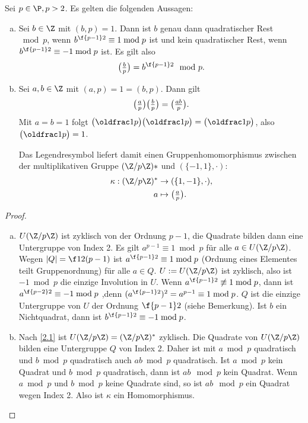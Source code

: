 \begin{lem} \label{2.14}
	Sei $p \in \P, p > 2$.
	Es gelten die folgenden Aussagen:
	\begin{enumerate}[a)]
		\item
			Sei $b \in \Z$ mit $(b, p) = 1$.
			Dann ist $b$ genau dann quadratischer Rest $\bmod p$, wenn $b^{\f {p-1}2} \equiv 1 \bmod p$
			ist und kein quadratischer Rest, wenn $b^{\f {p-1}2} \equiv -1 \bmod p$	ist.
			Es gilt also
			\[
				\legsym bp = b^{\f {p-1}2} \mod p.
			\]
		\item
			Sei $a, b \in \Z$ mit $(a,p) = 1 = (b, p)$.
			Dann gilt
			\[
				\legsym ap \legsym bp = \legsym {ab}p.
			\]
			Mit $a = b = 1$ folgt $\legsym 1p \legsym 1p = \legsym 1p$, also $\legsym 1p = 1$.

			Das Legendresymbol liefert damit einen Gruppenhomomorphismus zwischen der multiplikativen Gruppe $(\Z / p\Z)*$ und $(\{-1,1\}, \cdot)$:
			\begin{align*}
				\kappa: (\Z / p\Z)^* &\to (\{1,-1\}, \cdot), \\
				a &\mapsto \legsym ap.
			\end{align*}
	\end{enumerate}
	\begin{proof}
		\begin{enumerate}[a)]
			\item
				$U(\Z / p\Z)$ ist zyklisch von der Ordnung $p - 1$, die Quadrate bilden dann eine Untergruppe von Index 2.
				Es gilt $a^{p-1} \equiv 1 \bmod p$ für alle $a \in U(\Z / p\Z)$.
				Wegen $|Q| = \f 12 (p-1)$ ist $a^{\f {p-1}2} \equiv 1 \bmod p$ (Ordnung eines Elementes teilt Gruppenordnung) für alle $a \in Q$.
				$U := U(\Z / p \Z)$ ist zyklisch, also ist $-1 \bmod p$ die einzige Involution in $U$.
				Wenn $a^{\f{p-1}2} \not\equiv 1 \bmod p$, dann ist $a^{\f{p-2}2} \equiv -1 \bmod p$ ,denn $(a^{\f{p-1}2})^2 = a^{p-1} \equiv 1 \bmod p$.
				$Q$ ist die einzige Untergruppe von $U$ der Ordnung $\f{p-1}2$ (siehe Bemerkung).
				Ist $b$ ein Nichtquadrat, dann ist $b^{\f{p-1}2} \equiv -1 \bmod p$.
			\item
				Nach \ref{2.1} ist $U(\Z / p\Z) = (\Z / p\Z)^*$ zyklisch.
				Die Quadrate von $U(\Z / p \Z)$ bilden eine Untergruppe $Q$ von Index 2. \Exercise
				Daher ist mit $a \bmod p$ quadratisch und $b \bmod p$ quadratisch auch $ab \bmod p$ quadratisch.
				Ist $a \bmod p$ kein Quadrat und $b \bmod p$ quadratisch, dann ist $ab \mod p$ kein Quadrat.
				Wenn $a \bmod p$ und $b \bmod p$ keine Quadrate sind, so ist $ab \mod p$ ein Quadrat wegen Index 2.
				Also ist $\kappa$ ein Homomorphismus.
		\end{enumerate}
	\end{proof}
\end{lem}

